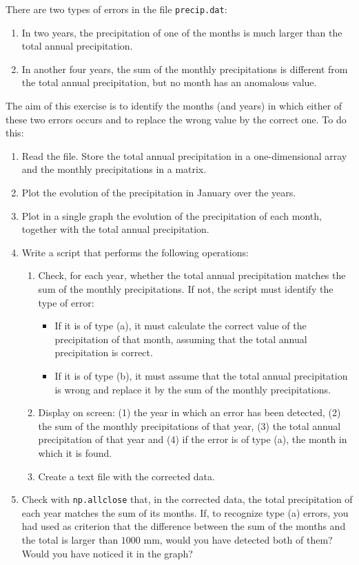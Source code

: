 \begin{enumerate}
There are two types of errors in the file \texttt{precip.dat}:
\begin{enumerate}
    \item[(a)] In two years, the precipitation of one of the months is much larger than the total annual precipitation.
    \item[(b)] In another four years, the sum of the monthly precipitations is different from the total annual precipitation, but no month has an anomalous value.
\end{enumerate}
The aim of this exercise is to identify the months (and years) in which either of these two errors occurs and to replace the wrong value by the correct one. To do this:
\begin{enumerate}
    \item Read the file. Store the total annual precipitation in a one-dimensional array and the monthly precipitations in a matrix.
    \item Plot the evolution of the precipitation in January over the years.
    \item Plot in a single graph the evolution of the precipitation of each month, together with the total annual precipitation.
    \item Write a script that performs the following operations:
    \begin{enumerate}
        \item Check, for each year, whether the total annual precipitation matches the sum of the monthly precipitations. If not, the script must identify the type of error:
        \begin{itemize}
            \item If it is of type (a), it must calculate the correct value of the precipitation of that month, assuming that the total annual precipitation is correct.
            \item If it is of type (b), it must assume that the total annual precipitation is wrong and replace it by the sum of the monthly precipitations.
        \end{itemize}
        \item Display on screen: (1) the year in which an error has been detected, (2) the sum of the monthly precipitations of that year, (3) the total annual precipitation of that year and (4) if the error is of type (a), the month in which it is found.
        \item Create a text file with the corrected data.
    \end{enumerate}
    \item Check with \texttt{np.allclose} that, in the corrected data, the total precipitation of each year matches the sum of its months. If, to recognize type (a) errors, you had used as criterion that the difference between the sum of the months and the total is larger than $1000$ mm, would you have detected both of them? Would you have noticed it in the graph?
\end{enumerate}


\end{enumerate}
